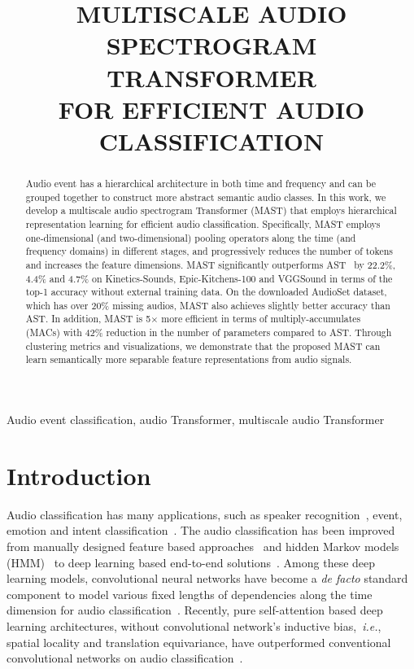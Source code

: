 \documentclass{article}
\title{MULTISCALE AUDIO SPECTROGRAM TRANSFORMER \\ FOR EFFICIENT AUDIO CLASSIFICATION}
\def\ie{\emph{i.e.}}
\begin{document}
\maketitle
\begin{abstract}
Audio event has a hierarchical architecture in both time and frequency and can be grouped together to construct more abstract semantic audio classes. In this work, we develop a multiscale audio spectrogram Transformer (MAST) that employs hierarchical representation learning for efficient audio classification. Specifically, MAST employs one-dimensional (and two-dimensional) pooling operators along the time (and frequency domains) in different stages, and progressively reduces the number of tokens and increases the feature dimensions. MAST significantly outperforms AST~\cite{gong2021ast} by 22.2\%, 4.4\% and 4.7\% on Kinetics-Sounds, Epic-Kitchens-100 and VGGSound in terms of the top-1 accuracy without external training data. On the downloaded AudioSet dataset, which has over 20\% missing audios, MAST also achieves slightly better accuracy than AST. In addition, MAST is 5$\times$ more efficient in terms of multiply-accumulates (MACs) with 42\% reduction in the number of parameters compared to AST. Through clustering metrics and visualizations, we demonstrate that the proposed MAST can learn semantically more separable feature representations from audio signals.  \end{abstract}
\begin{keywords}
Audio event classification, audio Transformer, multiscale audio Transformer
\end{keywords}
\section{Introduction}
\label{sec:intro}
Audio classification has many applications, such as speaker recognition~\cite{zhu2021speechnas}, event, emotion and intent classification~\cite{li2018attention,gong2021ast}. The audio classification has been improved from manually designed feature based approaches~\cite{eyben2013recent,schuller2013interspeech} and hidden Markov models (HMM)~\cite{woodard1992modeling} to deep learning based end-to-end solutions~\cite{jaitly2011learning,dieleman2014end,trigeorgis2016adieu}. Among these deep learning models, convolutional neural networks have become a \textit{de facto} standard component to model various fixed lengths of dependencies along the time dimension for audio classification~\cite{lecun1995convolutional,hershey2017cnn}. Recently, pure self-attention based deep learning architectures, without convolutional network's inductive bias,~\ie, spatial locality and translation equivariance, have outperformed conventional convolutional networks on audio classification~\cite{gong2021ast,gong2022ssast}.  
\end{document}
